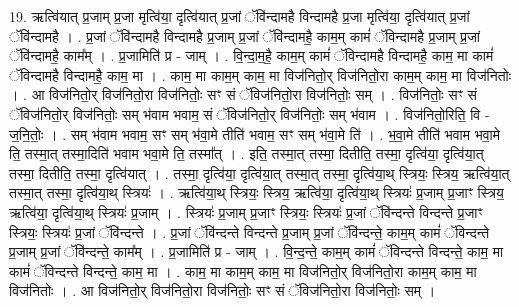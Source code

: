 \documentclass[17pt]{extarticle}
\begin{document}
19. ऋत्वि॑यात् प्र॒जाम् प्र॒जा मृत्वि॑या॒ दृत्वि॑यात् प्र॒जां ॅवि॑न्दामहै विन्दामहै प्र॒जा मृत्वि॑या॒ दृत्वि॑यात् प्र॒जां ॅवि॑न्दामहै । . प्र॒जां ॅवि॑न्दामहै विन्दामहै प्र॒जाम् प्र॒जां ॅवि॑न्दामहै॒ काम॒म् कामं॑ ॅविन्दामहै प्र॒जाम् प्र॒जां ॅवि॑न्दामहै॒ काम᳚म् । . प्र॒जामिति॑ प्र - जाम् । . वि॒न्दा॒म॒है॒ काम॒म् कामं॑ ॅविन्दामहै विन्दामहै॒ काम॒ मा कामं॑ ॅविन्दामहै विन्दामहै॒ काम॒ मा । . काम॒ मा काम॒म् काम॒ मा विज॑नितो॒र् विज॑नितो॒रा काम॒म् काम॒ मा विज॑नितोः । . आ विज॑नितो॒र् विज॑नितो॒रा विज॑नितोः॒ सꣳ सं ॅविज॑नितो॒रा विज॑नितोः॒ सम् । . विज॑नितोः॒ सꣳ सं ॅविज॑नितो॒र् विज॑नितोः॒ सम् भ॑वाम भवाम॒ सं ॅविज॑नितो॒र् विज॑नितोः॒ सम् भ॑वाम । . विज॑नितो॒रिति॒ वि - ज॒नि॒तोः॒ । . सम् भ॑वाम भवाम॒ सꣳ सम् भ॑वा॒मे तीति॑ भवाम॒ सꣳ सम् भ॑वा॒मे ति॑ । . भ॒वा॒मे तीति॑ भवाम भवा॒मे ति॒ तस्मा॒त् तस्मा॒दिति॑ भवाम भवा॒मे ति॒ तस्मा᳚त् । . इति॒ तस्मा॒त् तस्मा॒ दितीति॒ तस्मा॒ दृत्वि॑या॒ दृत्वि॑या॒त् तस्मा॒ दितीति॒ तस्मा॒ दृत्वि॑यात् । . तस्मा॒ दृत्वि॑या॒ दृत्वि॑या॒त् तस्मा॒त् तस्मा॒ दृत्वि॑या॒थ् स्त्रियः॒ स्त्रिय॒ ऋत्वि॑या॒त् तस्मा॒त् तस्मा॒ दृत्वि॑या॒थ् स्त्रियः॑ । . ऋत्वि॑या॒थ् स्त्रियः॒ स्त्रिय॒ ऋत्वि॑या॒ दृत्वि॑या॒थ् स्त्रियः॑ प्र॒जाम् प्र॒जाꣳ स्त्रिय॒ ऋत्वि॑या॒ दृत्वि॑या॒थ् स्त्रियः॑ प्र॒जाम् । . स्त्रियः॑ प्र॒जाम् प्र॒जाꣳ स्त्रियः॒ स्त्रियः॑ प्र॒जां ॅवि॑न्दन्ते विन्दन्ते प्र॒जाꣳ स्त्रियः॒ स्त्रियः॑ प्र॒जां ॅवि॑न्दन्ते । . प्र॒जां ॅवि॑न्दन्ते विन्दन्ते प्र॒जाम् प्र॒जां ॅवि॑न्दन्ते॒ काम॒म् कामं॑ ॅविन्दन्ते प्र॒जाम् प्र॒जां ॅवि॑न्दन्ते॒ काम᳚म् । . प्र॒जामिति॑ प्र - जाम् । . वि॒न्द॒न्ते॒ काम॒म् कामं॑ ॅविन्दन्ते विन्दन्ते॒ काम॒ मा कामं॑ ॅविन्दन्ते विन्दन्ते॒ काम॒ मा । . काम॒ मा काम॒म् काम॒ मा विज॑नितो॒र् विज॑नितो॒रा काम॒म् काम॒ मा विज॑नितोः । . आ विज॑नितो॒र् विज॑नितो॒रा विज॑नितोः॒ सꣳ सं ॅविज॑नितो॒रा विज॑नितोः॒ सम् । \newline
\end{document}
